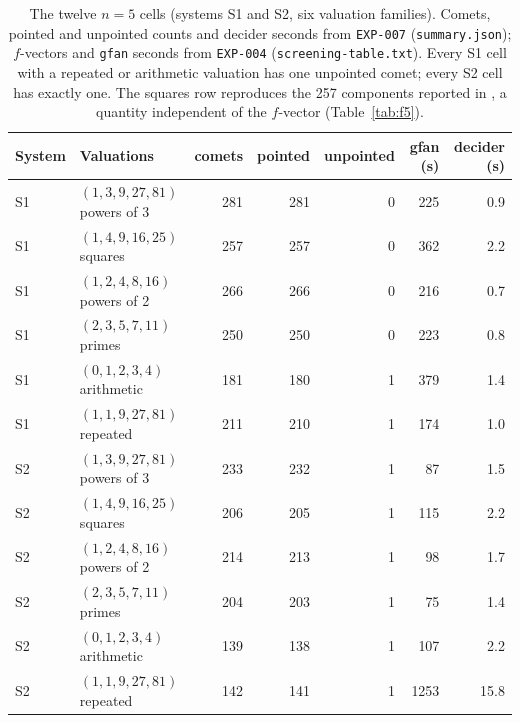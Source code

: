 \documentclass[11pt]{article}
\theoremstyle{definition}
\theoremstyle{remark}
\begin{document}
\begin{table}[t]\centering\footnotesize\setlength{\tabcolsep}{3pt}
\begin{tabular}{@{}llrrrrr@{}}
\toprule
System & Valuations & comets & pointed & unpointed & gfan (s) & decider (s) \\
\midrule
S1 & $(1,3,9,27,81)$ powers of 3 & 281 & 281 & 0 & 225 & 0.9 \\
S1 & $(1,4,9,16,25)$ squares & 257 & 257 & 0 & 362 & 2.2 \\
S1 & $(1,2,4,8,16)$ powers of 2 & 266 & 266 & 0 & 216 & 0.7 \\
S1 & $(2,3,5,7,11)$ primes & 250 & 250 & 0 & 223 & 0.8 \\
S1 & $(0,1,2,3,4)$ arithmetic & 181 & 180 & 1 & 379 & 1.4 \\
S1 & $(1,1,9,27,81)$ repeated & 211 & 210 & 1 & 174 & 1.0 \\
\midrule
S2 & $(1,3,9,27,81)$ powers of 3 & 233 & 232 & 1 & 87 & 1.5 \\
S2 & $(1,4,9,16,25)$ squares & 206 & 205 & 1 & 115 & 2.2 \\
S2 & $(1,2,4,8,16)$ powers of 2 & 214 & 213 & 1 & 98 & 1.7 \\
S2 & $(2,3,5,7,11)$ primes & 204 & 203 & 1 & 75 & 1.4 \\
S2 & $(0,1,2,3,4)$ arithmetic & 139 & 138 & 1 & 107 & 2.2 \\
S2 & $(1,1,9,27,81)$ repeated & 142 & 141 & 1 & 1253 & 15.8 \\
\bottomrule
\end{tabular}
\caption{The twelve $n=5$ cells (systems S1 and S2, six valuation families). Comets, pointed and
unpointed counts and decider seconds from \texttt{EXP-007} (\texttt{summary.json});
$f$-vectors and \texttt{gfan} seconds from \texttt{EXP-004} (\texttt{screening-table.txt}).
Every S1 cell with a repeated or arithmetic valuation has one unpointed comet; every S2 cell has
exactly one. The squares row reproduces the 257 components reported in \cite{JL25}, a quantity
independent of the $f$-vector (Table~\ref{tab:f5}).}\label{tab:n5}
\end{table}
\end{document}

